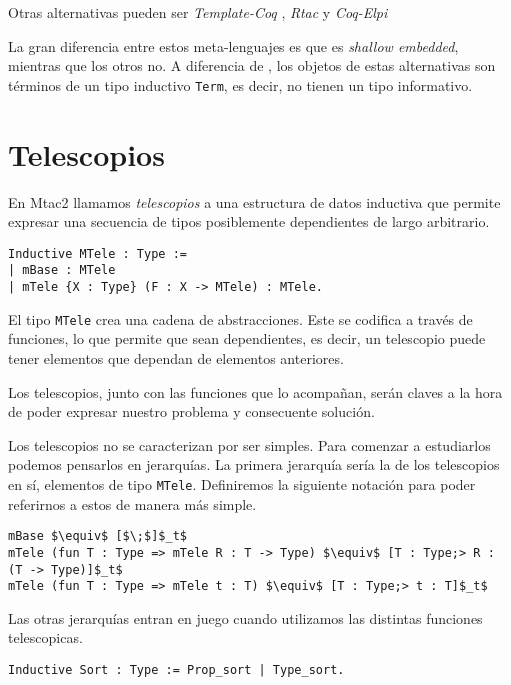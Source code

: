 Otras alternativas pueden ser \emph{Template-Coq} \cite{DBLP:conf/itp/AnandBCST18}, \emph{Rtac} \cite{DBLP:conf/esop/MalechaB16} y \emph{Coq-Elpi} \cite{tassi:hal-01637063}

La gran diferencia entre estos meta-lenguajes es que \Mtac es \emph{shallow embedded}, mientras que los otros no. A diferencia de \Mtac, los objetos de estas alternativas son términos de un tipo inductivo \lstinline{Term}, es decir, no tienen un tipo informativo.

\section{Telescopios}

En Mtac2 llamamos \textit{telescopios} a una estructura de datos inductiva
que permite expresar una secuencia de tipos posiblemente dependientes de largo arbitrario.

\begin{lstlisting}[frame=tb,caption={Definicion de telescopio},label=lst:MTele]
Inductive MTele : Type :=
| mBase : MTele
| mTele {X : Type} (F : X -> MTele) : MTele.
\end{lstlisting}

El tipo \lstinline{MTele} crea una cadena de abstracciones.
Este se codifica a través de funciones, lo que permite que sean dependientes, es decir, un telescopio puede tener elementos que dependan de elementos anteriores.

Los telescopios, junto con las funciones que lo acompañan, serán claves a la hora de poder expresar nuestro problema y consecuente solución.

Los telescopios no se caracterizan por ser simples.
Para comenzar a estudiarlos podemos pensarlos en jerarquías.
La primera jerarquía sería la de los telescopios en sí, elementos de tipo \lstinline{MTele}. Definiremos la siguiente notación para poder referirnos a estos de manera más simple.

\begin{lstlisting}
mBase $\equiv$ [$\;$]$_t$
mTele (fun T : Type => mTele R : T -> Type) $\equiv$ [T : Type;> R : (T -> Type)]$_t$
mTele (fun T : Type => mTele t : T) $\equiv$ [T : Type;> t : T]$_t$
\end{lstlisting}

Las otras jerarquías entran en juego cuando utilizamos las distintas funciones telescopicas.

\begin{lstlisting}[frame=tb,caption={Definición de \lstinline{Sort}},label=lst:Sort]
Inductive Sort : Type := Prop_sort | Type_sort.
\end{lstlisting}

